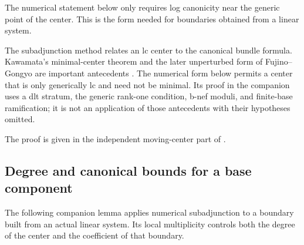 The numerical statement below only requires log canonicity near
the generic point of the center. This is the form needed for
boundaries obtained from a linear system.

The subadjunction method relates an lc center to the canonical bundle
formula. Kawamata's minimal-center theorem and the later unperturbed
form of Fujino--Gongyo are important antecedents
\cite{KawamataSubadjunction1998,FujinoGongyoSubadjunction2012}.
The numerical form below permits a center that is only generically lc
and need not be minimal. Its proof in the companion uses a dlt stratum,
the generic rank-one condition, b-nef moduli, and finite-base ramification;
it is not an application of those antecedents with their hypotheses
omitted.


\noindent The proof is given in the independent moving-center part of
\cite[Lemma~7.1]{OpenAIAbundance2026}.\par


\subsection{Degree and canonical bounds for a base component}

The following companion lemma applies numerical subadjunction to a boundary built from an
actual linear system. Its local multiplicity controls both the
degree of the center and the coefficient of that boundary.

